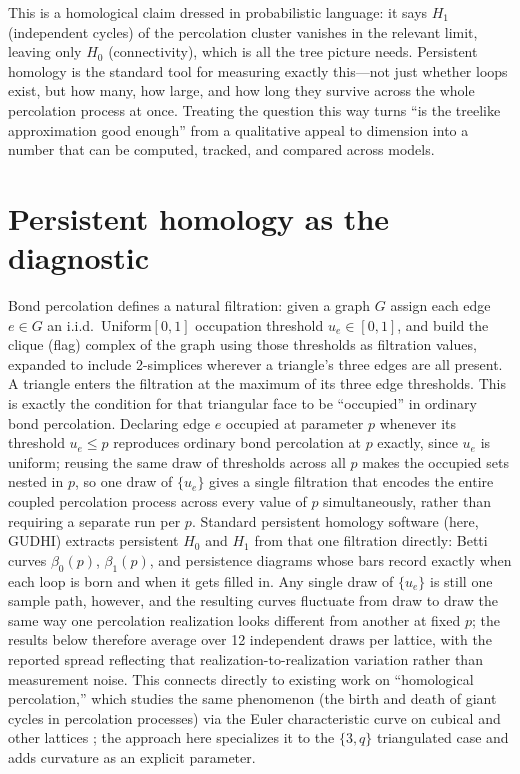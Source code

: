 \documentclass[11pt]{article}
\begin{document}
This is a homological claim dressed in probabilistic language: it says $H_1$ (independent cycles) of the percolation cluster vanishes in the relevant limit, leaving only $H_0$ (connectivity), which is all the tree picture needs. Persistent homology is the standard tool for measuring exactly this---not just whether loops exist, but how many, how large, and how long they survive across the whole percolation process at once. Treating the question this way turns ``is the treelike approximation good enough'' from a qualitative appeal to dimension into a number that can be computed, tracked, and compared across models.

\section{Persistent homology as the diagnostic}

Bond percolation defines a natural filtration: given a graph $G$ assign each edge $e\in G$ an i.i.d.\ Uniform$[0,1]$ occupation threshold $u_e\in[0,1]$, and build the clique (flag) complex of the graph using those thresholds as filtration values, expanded to include 2-simplices wherever a triangle's three edges are all present. A triangle enters the filtration at the maximum of its three edge thresholds. This is exactly the condition for that triangular face to be ``occupied'' in ordinary bond percolation. Declaring edge $e$ occupied at parameter $p$ whenever its threshold $u_e \le p$ reproduces ordinary bond percolation at $p$ exactly, since $u_e$ is uniform; reusing the same draw of thresholds across all $p$ makes the occupied sets nested in $p$, so one draw of $\{u_e\}$ gives a single filtration that encodes the entire coupled percolation process across every value of $p$ simultaneously, rather than requiring a separate run per $p$. Standard persistent homology software (here, GUDHI) extracts persistent $H_0$ and $H_1$ from that one filtration directly: Betti curves $\beta_0(p)$, $\beta_1(p)$, and persistence diagrams whose bars record exactly when each loop is born and when it gets filled in. Any single draw of $\{u_e\}$ is still one sample path, however, and the resulting curves fluctuate from draw to draw the same way one percolation realization looks different from another at fixed $p$; the results below therefore average over 12 independent draws per lattice, with the reported spread reflecting that realization-to-realization variation rather than measurement noise. This connects directly to existing work on ``homological percolation,'' which studies the same phenomenon (the birth and death of giant cycles in percolation processes) via the Euler characteristic curve on cubical and other lattices \citep{bobrowski2020}; the approach here specializes it to the $\{3,q\}$ triangulated case and adds curvature as an explicit parameter.
\end{document}

